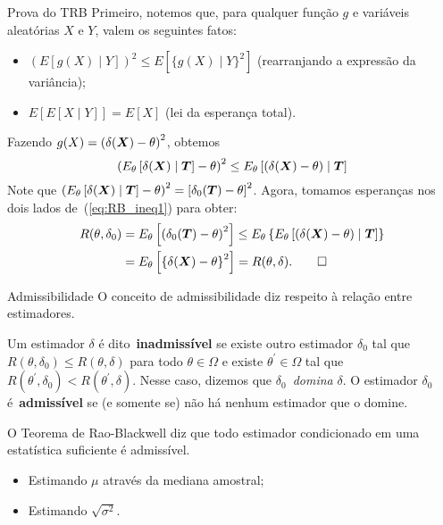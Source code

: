 \begin{frame}{Prova do TRB}
 Primeiro, notemos que, para qualquer função $g$ e variáveis aleatórias $X$ e $Y$, valem os seguintes fatos:
 \begin{itemize}
  \item $\left(E[g(X) \mid Y] \right)^2 \leq E\left[\{g(X) \mid Y\}^2\right]$ (rearranjando a expressão da variância);
  \item $E[E[X\mid Y]] = E[X]$ (lei da esperança total).
 \end{itemize}

 Fazendo $g(X) = \left( \delta(\boldsymbol{X})-\theta\right)^2$, obtemos
 \begin{equation}
 \label{eq:RB_ineq1}
  \left(E_{\theta}\left[\delta(\boldsymbol{X}) \mid \boldsymbol{T} \right] -\theta \right)^2 \leq E_{\theta}\left[\left( \delta(\boldsymbol{X}) - \theta \right) \mid \boldsymbol{T} \right]
 \end{equation}
Note que $\left(E_{\theta}\left[\delta(\boldsymbol{X}) \mid \boldsymbol{T} \right] -\theta \right)^2 = \left[\delta_0(\boldsymbol{T}) -\theta \right]^2$.
Agora, tomamos esperanças nos dois lados de~(\ref{eq:RB_ineq1}) para obter:
\begin{align*}
  R(\theta, \delta_0) &= E_{\theta}\left[ \left(\delta_0(\boldsymbol{T}) -\theta \right)^2 \right] \leq E_{\theta}\left\{E_{\theta}\left[\left( \delta(\boldsymbol{X}) - \theta \right) \mid \boldsymbol{T} \right]\right\} \\
  &= E_{\theta}\left[ \left\{\delta(\boldsymbol{X}) -\theta \right\}^2 \right] = R(\theta, \delta). \qed
\end{align*}
\end{frame}

\begin{frame}{Admissibilidade}
O conceito de admissibilidade diz respeito à relação entre estimadores.
\begin{defn}[Admissibilidade]
 \label{def:admissibility}
 Um estimador $\delta$ é dito~\textbf{inadmissível} se existe outro estimador $\delta_0$ tal que $R(\theta, \delta_0) \leq R(\theta, \delta)$ para todo $\theta \in \Omega$ e existe $\theta^\prime \in \Omega$ tal que $R(\theta^\prime, \delta_0) < R(\theta^\prime, \delta)$.
 Nesse caso, dizemos que $\delta_0$~\textit{domina} $\delta$.
 O estimador $\delta_0$ é~\textbf{admissível} se (e somente se) não há nenhum estimador que o domine.
\end{defn}

\begin{obs}
 O Teorema de Rao-Blackwell diz que todo estimador condicionado em uma estatística suficiente é admissível.
\end{obs}

\begin{exemplo}
\begin{itemize}
 \item Estimando $\mu$ através da mediana amostral;
 \item Estimando $\sqrt{\sigma^2}$.
\end{itemize}
\end{exemplo}

\end{frame}



